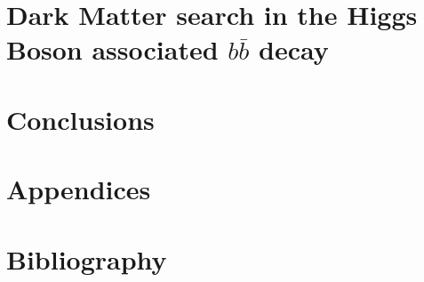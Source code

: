 \documentclass[11pt,openright,oneside,letterpaper,onecolumn]{report}  %
\begin{document}
\part{Dark Matter search in the Higgs Boson associated $b\bar{b}$ decay}
\label{sec:corpus}


\part{Conclusions}
\label{sec:conclusions}


\part{Appendices}
\appendix



\part{Bibliography}


\end{document}
